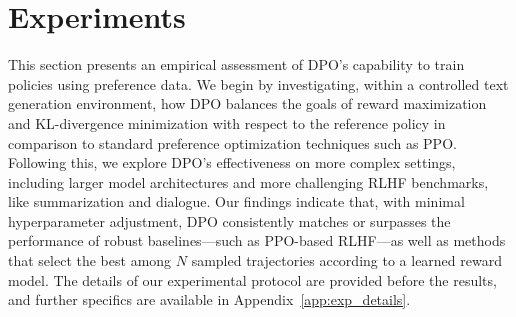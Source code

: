 \section{Experiments}
This section presents an empirical assessment of DPO’s capability to train policies using preference data. We begin by investigating, within a controlled text generation environment, how DPO balances the goals of reward maximization and KL-divergence minimization with respect to the reference policy in comparison to standard preference optimization techniques such as PPO. Following this, we explore DPO’s effectiveness on more complex settings, including larger model architectures and more challenging RLHF benchmarks, like summarization and dialogue. Our findings indicate that, with minimal hyperparameter adjustment, DPO consistently matches or surpasses the performance of robust baselines—such as PPO-based RLHF—as well as methods that select the best among $N$ sampled trajectories according to a learned reward model. The details of our experimental protocol are provided before the results, and further specifics are available in Appendix~\ref{app:exp_details}.


